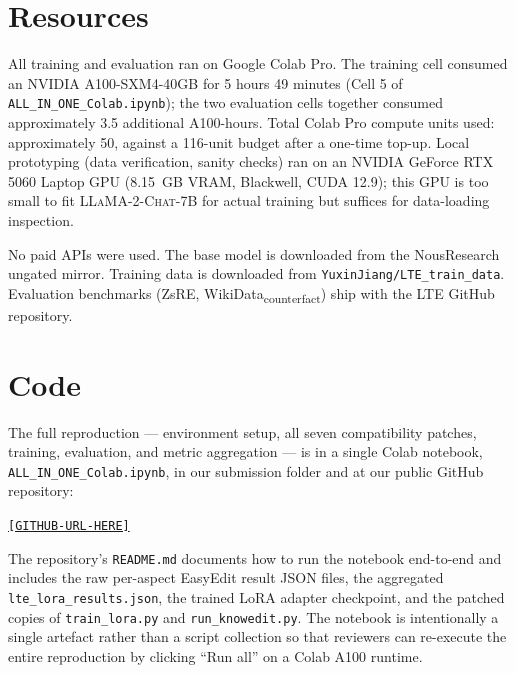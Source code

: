 \documentclass[11pt,a4paper,twocolumn]{article}
\begin{document}
\section{Resources}
\label{sec:resources}
All training and evaluation ran on Google Colab Pro. The training cell consumed an NVIDIA A100-SXM4-40GB for 5 hours 49 minutes (Cell 5 of \texttt{ALL\_IN\_ONE\_Colab.ipynb}); the two evaluation cells together consumed approximately 3.5 additional A100-hours. Total Colab Pro compute units used: approximately 50, against a 116-unit budget after a one-time top-up. Local prototyping (data verification, sanity checks) ran on an NVIDIA GeForce RTX 5060 Laptop GPU (8.15~GB VRAM, Blackwell, CUDA 12.9); this GPU is too small to fit \textsc{LLaMA-2-Chat-7B} for actual training but suffices for data-loading inspection.

No paid APIs were used. The base model is downloaded from the NousResearch ungated mirror. Training data is downloaded from \texttt{YuxinJiang/LTE\_train\_data}. Evaluation benchmarks (ZsRE, WikiData\textsubscript{counterfact}) ship with the LTE GitHub repository.

\section{Code}
\label{sec:code}
The full reproduction --- environment setup, all seven compatibility patches, training, evaluation, and metric aggregation --- is in a single Colab notebook, \texttt{ALL\_IN\_ONE\_Colab.ipynb}, in our submission folder and at our public GitHub repository:
\begin{center}
\href{https://github.com/}{\texttt{[GITHUB-URL-HERE]}}
\end{center}
The repository's \texttt{README.md} documents how to run the notebook end-to-end and includes the raw per-aspect EasyEdit result JSON files, the aggregated \texttt{lte\_lora\_results.json}, the trained LoRA adapter checkpoint, and the patched copies of \texttt{train\_lora.py} and \texttt{run\_knowedit.py}. The notebook is intentionally a single artefact rather than a script collection so that reviewers can re-execute the entire reproduction by clicking ``Run all'' on a Colab A100 runtime.
\end{document}
